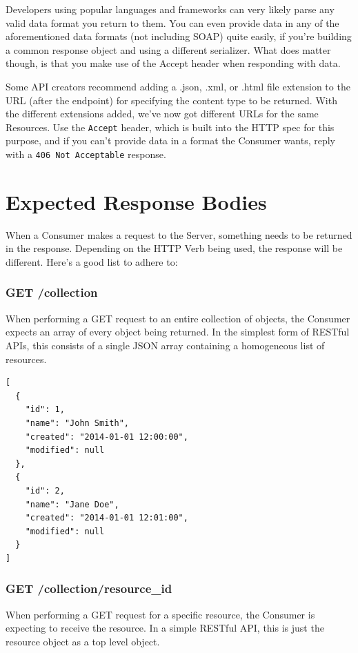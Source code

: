 \documentclass{book}
\begin{document}
Developers using popular languages and frameworks can very likely parse any valid data format you return to them. You can even provide data in any of the aforementioned data formats (not including SOAP) quite easily, if you're building a common response object and using a different serializer. What does matter though, is that you make use of the Accept header when responding with data.

Some API creators recommend adding a .json, .xml, or .html file extension to the URL (after the endpoint) for specifying the content type to be returned. With the different extensions added, we've now got different URLs for the same Resources. Use the \texttt{Accept} header, which is built into the HTTP spec for this purpose, and if you can't provide data in a format the Consumer wants, reply with a \texttt{406 Not Acceptable} response.


\section{Expected Response Bodies}

When a Consumer makes a request to the Server, something needs to be returned in the response. Depending on the HTTP Verb being used, the response will be different. Here's a good list to adhere to:

\subsubsection{GET /collection}

When performing a GET request to an entire collection of objects, the Consumer expects an array of every object being returned. In the simplest form of RESTful APIs, this consists of a single JSON array containing a homogeneous list of resources.

\begin{verbatim}
[
  {
    "id": 1,
    "name": "John Smith",
    "created": "2014-01-01 12:00:00",
    "modified": null
  },
  {
    "id": 2,
    "name": "Jane Doe",
    "created": "2014-01-01 12:01:00",
    "modified": null
  }
]
\end{verbatim}

\subsubsection{GET /collection/resource\_id}

When performing a GET request for a specific resource, the Consumer is expecting to receive the resource. In a simple RESTful API, this is just the resource object as a top level object.
\end{document}
